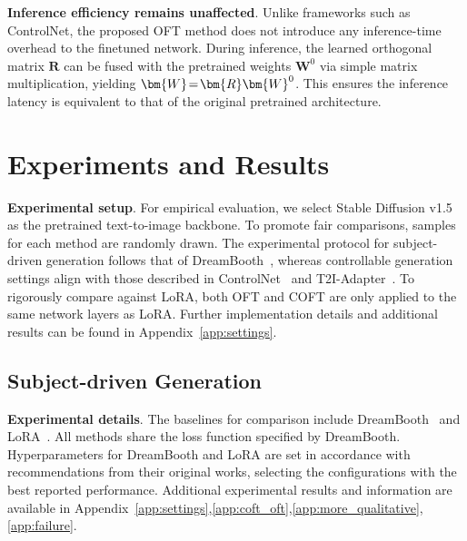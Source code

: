\textbf{Inference efficiency remains unaffected}. Unlike frameworks such as ControlNet, the proposed OFT method does not introduce any inference-time overhead to the finetuned network. During inference, the learned orthogonal matrix $\bm{R}$ can be fused with the pretrained weights $\bm{W}^0$ via simple matrix multiplication, yielding $\thickmuskip=2mu \medmuskip=2mu \bm{W}=\bm{R}\bm{W}^0$. This ensures the inference latency is equivalent to that of the original pretrained architecture.

\section{Experiments and Results}

\textbf{Experimental setup}. For empirical evaluation, we select Stable Diffusion v1.5~\cite{rombach2022high} as the pretrained text-to-image backbone. To promote fair comparisons, samples for each method are randomly drawn. The experimental protocol for subject-driven generation follows that of DreamBooth~\cite{ruiz2023dreambooth}, whereas controllable generation settings align with those described in ControlNet~\cite{zhang2023adding} and T2I-Adapter~\cite{mou2023t2i}. To rigorously compare against LoRA, both OFT and COFT are only applied to the same network layers as LoRA. Further implementation details and additional results can be found in Appendix~\ref{app:settings}.

\subsection{Subject-driven Generation}

\textbf{Experimental details}. The baselines for comparison include DreamBooth~\cite{ruiz2023dreambooth} and LoRA~\cite{hulora2022}. All methods share the loss function specified by DreamBooth. Hyperparameters for DreamBooth and LoRA are set in accordance with recommendations from their original works, selecting the configurations with the best reported performance. Additional experimental results and information are available in Appendix~\ref{app:settings},\ref{app:coft_oft},\ref{app:more_qualitative},\ref{app:failure}.

